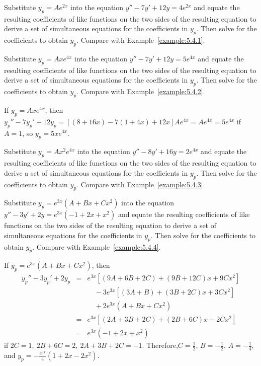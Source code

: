 \documentclass{ximera}
\begin{document}
\begin{problem}\label{exer:5.4.31}  Substitute $y_p=Ae^{2x}$ into the equation $y''-7y'+12y=4e^{2x}$ and equate the resulting coefficients of like functions on the two sides of the resulting equation to derive a set of simultaneous equations for the coefficients in $y_p$. Then
solve for the coefficients to obtain $y_p$.
Compare with Example~\ref{example:5.4.1}.
\end{problem}


\begin{problem}\label{exer:5.4.32}
Substitute $y_p=Axe^{4x}$ into the equation $y''-7y'+12y=5e^{4x}$ and equate the resulting coefficients of like functions on the two sides of the resulting equation to derive a set of simultaneous equations for the coefficients in $y_p$. Then
solve for the coefficients to obtain $y_p$.
Compare with Example~\ref{example:5.4.2}.
\begin{solution}
If $y_p=Axe^{4x}$, then
$y_p''-7y_p'+12y_p=[(8+16x)-7(1+4x)+12x]Ae^{4x}=Ae^{4x}=5e^{4x}$
if $A=1$, so $y_p=5xe^{4x}$.
\end{solution}
\end{problem}

\begin{problem}\label{exer:5.4.33}
Substitute $y_p=Ax^2e^{4x}$ into the equation $y''-8y'+16y=2e^{4x}$ and equate the resulting coefficients of like functions on the two sides of the resulting equation to derive a set of simultaneous equations for the coefficients in $y_p$. Then
solve for the coefficients to obtain $y_p$.
Compare with Example~\ref{example:5.4.3}.
\end{problem}

\begin{problem}\label{exer:5.4.34}
Substitute $y_p=e^{3x}(A+Bx+Cx^2)$ into the equation $y''-3y'+2y=e^{3x}(-1+2x+x^2)$ and equate the resulting coefficients of like functions on the two sides of the resulting equation to derive a set of simultaneous equations for the coefficients in $y_p$. Then
solve for the coefficients to obtain $y_p$.
Compare with Example~\ref{example:5.4.4}.
\begin{solution}
If $y_p=e^{3x}(A+Bx+Cx^2)$, then
\begin{eqnarray*}
y_p''-3y_p'+2y_p&=&e^{3x}[(9A+6B+2C)+(9B+12C)x+9Cx^2]\\
&&\quad-3e^{3x}[(3A+B)+(3B+2C)x+3Cx^2]\\ &&\quad+2e^{3x}(A+Bx+Cx^2)\\
&=&e^{3x}[(2A+3B+2C)+(2B+6C)x+2Cx^2]\\&=& e^{3x}(-1+2x+x^2)
\end{eqnarray*}
if $2C=1,\ 2B+6C=2,\ 2A+3B+2C= -1$. Therefore,$C=\frac{1}{2}$,
$B=-\frac{1}{2}$, $A=-\frac{1}{4}$, and
$y_p=-\frac{e^{3x}}{4}(1+2x-2x^2)$.
\end{solution}
\end{problem}
\end{document}
